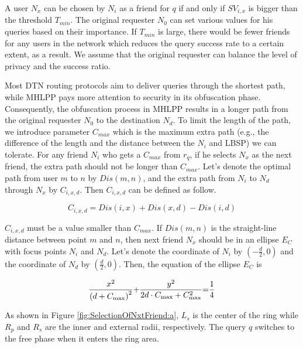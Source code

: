 A user ${N}_{x}$ can be chosen by ${N}_{i}$ as a friend for $q$ if and only if ${SV}_{i,x}$ is bigger than the threshold ${T}_{min}$. The original requester ${N}_{0}$ can set various values for his queries based on their importance. If ${T}_{min}$ is large, there would be fewer friends for any users in the network which reduces the query success rate to a certain extent, as a result. We assume that the original requester can balance the level of privacy and the success ratio. 

Most DTN routing protocols aim to deliver queries through the shortest path, while MHLPP pays more attention to security in its obfuscation phase. Consequently, the obfuscation process in MHLPP results in a longer path from the original requester ${N}_{0}$ to the destination ${N}_{d}$. To limit the length of the path, we introduce parameter ${C}_{max}$ which is the maximum extra path (e.g., the difference of the length and the distance between the ${N}_{i}$ and LBSP) we can tolerate. For any friend ${N}_{i}$ who gets a ${C}_{max}$ from ${r}_{q}$, if he selects ${N}_{x}$ as the next friend, the extra path should not be longer than ${C}_{max}$. Let's denote the optimal path from user $m$ to $n$ by ${Dis}\left (m,n\right )$, and the extra path from ${N}_{i}$ to ${N}_{d}$ through ${N}_{x}$ by ${C}_{i,x,d}$. Then ${C}_{i,x,d}$ can be defined as follow.

\begin{equation} \label{GrindEQ__1_} 
C_{i,x,d} =Dis(i,x)+Dis(x,d)-Dis(i,d) 
\end{equation} 

${C}_{i,x,d}$ must be a value smaller than ${C}_{max}$. If ${Dis}\left (m,n\right )$ is the straight-line distance between point $m$ and $n$, then next friend ${N}_{x}$ should be in an ellipse ${E}_{C}$ with focus points ${N}_{i}$ and ${N}_{d}$. Let's denote the coordinate of ${N}_{i}$ by $\left(-\frac{d}{2} ,0\right)$ and the coordinate of ${N}_{d}$ by $\left(\frac{d}{2} ,0\right)$. Then, the equation of the ellipse ${E}_{C}$ is

\begin{equation} \label{GrindEQ__2_} 
\frac{x^{2} }{\left(d+C_{\max } \right)^{2} } {\rm +}\frac{y^{2} }{2d\cdot C_{\max } +C_{\max }^{2} } {\rm =}\frac{1}{4}  
\end{equation}

As shown in Figure \ref{fig:SelectionOfNxtFriend:a}, ${L}_{s}$ is the center of the ring while ${R}_{p}$ and ${R}_{s}$ are the inner and external radii, respectively. The query $q$ switches to the free phase when it enters the ring area. 

